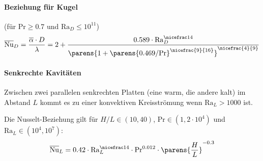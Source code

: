 	\paragraph{Beziehung für Kugel} %
		(für $\mathrm{Pr} \geq 0.7$ und $\mathrm{Ra}_D \leq 10^{11}$)
		\[
			\overline{\mathrm{Nu}}_D = \frac{\overline{\alpha} \cdot D}{\lambda} = 2 + \frac{0.589 \cdot \mathrm{Ra}_D^{\nicefrac 1 4}}{\parens{1 + \parens{0.469 / \mathrm{Pr}}^{\nicefrac{9}{16}}}^{\nicefrac{4}{9}}}
		\]

	\paragraph{Senkrechte Kavitäten} %
		Zwischen zwei parallelen senkrechten Platten (eine warm, die andere kalt) im Abstand $L$ kommt es zu einer konvektiven Kreisströmung wenn $\mathrm{Ra}_L > 1000$ ist.
		
		Die Nusselt-Beziehung gilt für $H/L \in (10,40)$, $\mathrm{Pr} \in (1,2\cdot10^4)$ und $\mathrm{Ra}_L \in (10^4,10^7)$:
		\[
		\overline{\mathrm{Nu}}_L = 0.42 \cdot \mathrm{Ra}_L^{\nicefrac 1 4} \cdot \mathrm{Pr}^{0.012} \cdot \parens{\frac H L}^{-0.3}
		\]
